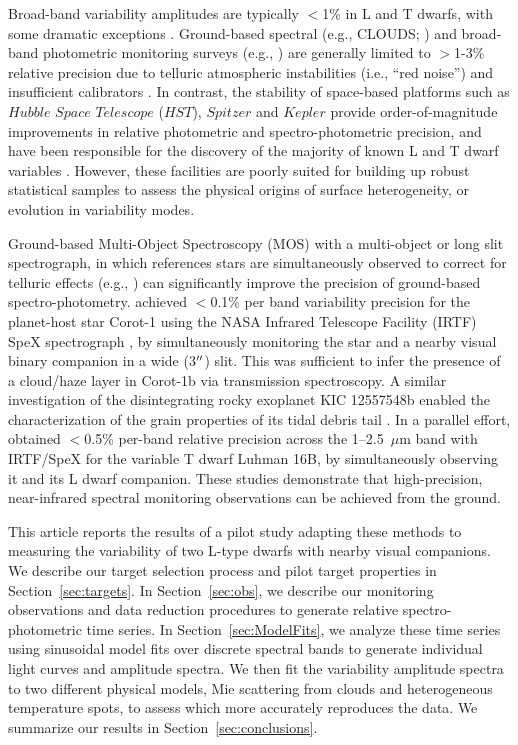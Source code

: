 \documentclass[twocolumn]{aastex6}
\begin{document}
Broad-band variability amplitudes are typically $<$1\% in L and T dwarfs, with some dramatic exceptions \citep{2009ApJ...701.1534A,2012ApJ...750..105R,2013A&A...555L...5G,2016ApJ...829L..32L}. 
Ground-based spectral (e.g., CLOUDS; \citealt{2008A&A...487..277G}) and broad-band photometric monitoring surveys (e.g., \citealt{1999A&A...348..800B,2003MNRAS.346..473K,2014ApJ...793...75R,2014A&A...566A.111W}) are generally limited to $>$1-3\% relative precision due to telluric atmospheric instabilities (i.e., ``red noise'') and insufficient calibrators \citep{2003MNRAS.339..477B}.
In contrast, the stability of space-based platforms such as $Hubble$ $Space$ $Telescope$ ($HST$), $Spitzer$ and $Kepler$ provide order-of-magnitude improvements in relative photometric and spectro-photometric precision, and have been responsible for the discovery of the majority of known L and T dwarf variables \citep{2013ApJ...768..121A,2013ApJ...779..172G,2015ApJ...799..154M}. However, these facilities are poorly suited for building up robust statistical samples to assess the physical origins of surface heterogeneity, or evolution in variability modes. 

Ground-based Multi-Object Spectroscopy (MOS) with a multi-object or long slit spectrograph, in which references stars are simultaneously observed to correct for telluric effects  (e.g., \citealt{bean10,bean2013,gibson13clouds,stevenson2016hatp26}) can significantly improve the precision of ground-based spectro-photometry. \citet{2014ApJ...783....5S} achieved $<$0.1\% per band variability precision for the planet-host star Corot-1 using the NASA Infrared Telescope Facility (IRTF) SpeX spectrograph \citep{2003PASP..115..362R}, by simultaneously monitoring the star and a nearby visual binary companion in a wide (3$\mbox{$^{\prime\prime}$}$) slit. This was sufficient to infer the presence of a cloud/haze layer in Corot-1b via transmission spectroscopy. A similar investigation of the disintegrating rocky exoplanet KIC 12557548b  enabled the characterization of the grain properties of its tidal debris tail \citep{2016ApJ...826..156S}. In a parallel effort, \citet{2014ApJ...785...48B} obtained $<$0.5\% per-band relative precision across the 1--2.5~$\mu$m band with IRTF/SpeX for the variable T dwarf Luhman 16B, by simultaneously observing it and its L dwarf companion. These studies demonstrate that high-precision, near-infrared spectral monitoring observations can be achieved from the ground.

This article reports the results of a pilot study adapting these methods to measuring the variability of two L-type dwarfs with nearby visual companions. We describe our target selection process and pilot target properties in Section~\ref{sec:targets}.
In Section~\ref{sec:obs}, we describe our monitoring observations and data reduction procedures to generate relative spectro-photometric time series.
In Section~\ref{sec:ModelFits}, we analyze these time series using sinusoidal model fits over discrete spectral bands to generate individual light curves and amplitude spectra.
We then fit the variability amplitude spectra to two different physical models, Mie scattering from clouds and heterogeneous temperature spots, to assess which more accurately reproduces the data.
We summarize our results in Section~\ref{sec:conclusions}.
\end{document}
